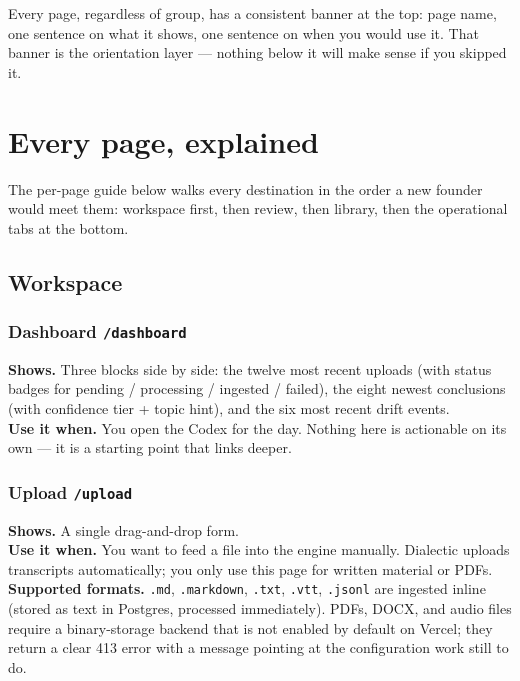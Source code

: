 \documentclass[11pt,letterpaper]{article}
\newcommand{\file}[1]{\texttt{#1}}
\begin{document}
Every page, regardless of group, has a consistent banner at the top: page name, one sentence on what it shows, one sentence on when you would use it. That banner is the orientation layer --- nothing below it will make sense if you skipped it.

\section{Every page, explained}

The per-page guide below walks every destination in the order a new founder would meet them: workspace first, then review, then library, then the operational tabs at the bottom.

\subsection{Workspace}

\subsubsection*{Dashboard \hfill \file{/dashboard}}
\textbf{Shows.} Three blocks side by side: the twelve most recent uploads (with status badges for pending / processing / ingested / failed), the eight newest conclusions (with confidence tier + topic hint), and the six most recent drift events. \\
\textbf{Use it when.} You open the Codex for the day. Nothing here is actionable on its own --- it is a starting point that links deeper.

\subsubsection*{Upload \hfill \file{/upload}}
\textbf{Shows.} A single drag-and-drop form. \\
\textbf{Use it when.} You want to feed a file into the engine manually. Dialectic uploads transcripts automatically; you only use this page for written material or PDFs. \\
\textbf{Supported formats.} \file{.md}, \file{.markdown}, \file{.txt}, \file{.vtt}, \file{.jsonl} are ingested inline (stored as text in Postgres, processed immediately). PDFs, DOCX, and audio files require a binary-storage backend that is not enabled by default on Vercel; they return a clear 413 error with a message pointing at the configuration work still to do.
\end{document}
